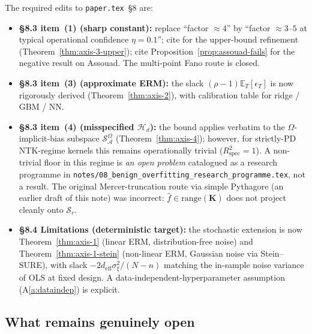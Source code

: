 \documentclass[11pt,a4paper]{article}
\theoremstyle{plain}
\theoremstyle{definition}
\theoremstyle{remark}
\newcommand{\bK}{\mathbf{K}}
\newcommand{\E}{\mathbb{E}}
\newcommand{\Rspec}{R^2_{\mathrm{spec}}}
\newcommand{\Scal}{\mathcal{S}}
\newcommand{\Acal}{\mathcal{A}}
\newcommand{\Hcal}{\mathcal{H}}
\begin{document}
The required edits to \texttt{paper.tex}~\S8 are:
\begin{itemize}[label=$\bullet$,leftmargin=*]
\item \textbf{\S8.3 item~(1) (sharp constant):} replace
    ``factor $\approx 4$'' by ``factor $\approx 3$--$5$ at typical
    operational confidence $\eta = 0.1$''; cite
    \citet{BardenetMaillard2015} for the upper-bound refinement
    (Theorem~\ref{thm:axis-3-upper}); cite
    Proposition~\ref{prop:assouad-fails} for the negative result
    on Assouad. The multi-point Fano route is closed.
\item \textbf{\S8.3 item~(3) (approximate ERM):} the slack
    $(\rho-1)\E_T[\epsilon_T]$ is now rigorously derived
    (Theorem~\ref{thm:axis-2}), with calibration table for ridge /
    GBM / NN.
\item \textbf{\S8.3 item~(4) (misspecified $\Hcal_d$):} the bound
    applies verbatim to the $\Omega$-implicit-bias subspace
    $\Scal_\Acal^\Omega$ (Theorem~\ref{thm:axis-4}); however, for
    strictly-PD NTK-regime kernels this remains operationally
    trivial ($\Rspec = 1$). A non-trivial floor in this regime is
    \emph{an open problem} catalogued as a research programme in
    \texttt{notes/08\_benign\_overfitting\_research\_programme.tex},
    not a result. The original Mercer-truncation route via simple
    Pythagore (an earlier draft of this note) was incorrect:
    $\hat f \in \mathrm{range}(\bK)$ does not project cleanly onto
    $\Scal_r$.
\item \textbf{\S8.4 Limitations (deterministic target):} the
    stochastic extension is now Theorem~\ref{thm:axis-1}
    (linear ERM, distribution-free noise) and
    Theorem~\ref{thm:axis-1-stein} (non-linear ERM, Gaussian noise
    via Stein--SURE), with slack $-2 d_{\mathrm{eff}}\sigma_\xi^2/(N-n)$
    matching the in-sample noise variance of OLS at fixed design.
    A data-independent-hyperparameter assumption (A\ref{a:dataindep})
    is explicit.
\end{itemize}

\subsection{What remains genuinely open}
\end{document}
